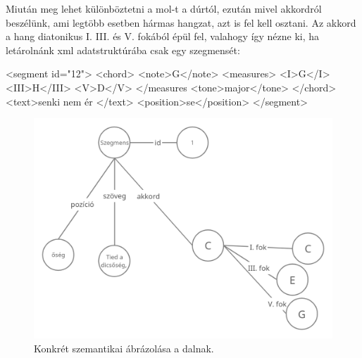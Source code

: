 Miután meg lehet különböztetni a mol-t a dúrtól, ezután mivel akkordról beszélünk, ami legtöbb esetben hármas hangzat, azt is fel kell osztani. Az akkord a hang diatonikus I. III. és V. fokából épül fel, valahogy így nézne ki, ha letárolnánk xml adatstruktúrába csak egy szegmensét:
\begin{xml}
	<segment id="12">
	<chord>
	<note>G</note>
	<measures>
	<I>G</I>
	<III>H</III>
	<V>D</V>
	</measures
	<tone>major</tone>
	</chord>
	<text>senki nem ér </text>
	<position>se</position>
	</segment>
\end{xml}


\begin{figure}[h]
	\includegraphics[scale=0.3]{images/rdf_graph_2.png}
	\caption{Konkrét szemantikai ábrázolása a dalnak.}
	\label{fig:graph2}
\end{figure}

